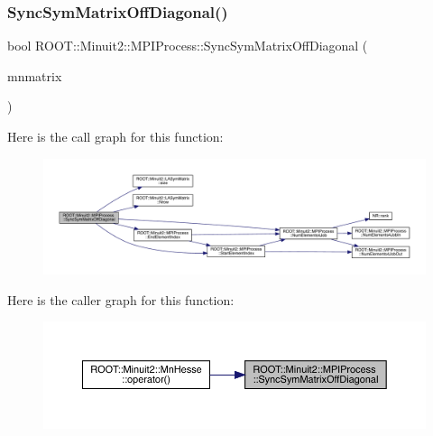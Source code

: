 \mbox{\label{classROOT_1_1Minuit2_1_1MPIProcess_ac00f83396ec6b7985dad640981a07657}} 
\subsubsection{\texorpdfstring{SyncSymMatrixOffDiagonal()}{SyncSymMatrixOffDiagonal()}\hspace{0.1cm}{\footnotesize\ttfamily [1/2]}}
{\footnotesize\ttfamily bool R\+O\+O\+T\+::\+Minuit2\+::\+M\+P\+I\+Process\+::\+Sync\+Sym\+Matrix\+Off\+Diagonal (\begin{DoxyParamCaption}\item[{\mbox{\hyperlink{namespaceROOT_1_1Minuit2_a9e74ad97f5537a2e80e52b04d98ecc6e}{R\+O\+O\+T\+::\+Minuit2\+::\+Mn\+Algebraic\+Sym\+Matrix}} \&}]{mnmatrix }\end{DoxyParamCaption})}

Here is the call graph for this function\+:\nopagebreak
\begin{figure}[H]
\begin{center}
\leavevmode
\includegraphics[width=350pt]{dc/d43/classROOT_1_1Minuit2_1_1MPIProcess_ac00f83396ec6b7985dad640981a07657_cgraph}
\end{center}
\end{figure}
Here is the caller graph for this function\+:\nopagebreak
\begin{figure}[H]
\begin{center}
\leavevmode
\includegraphics[width=350pt]{dc/d43/classROOT_1_1Minuit2_1_1MPIProcess_ac00f83396ec6b7985dad640981a07657_icgraph}
\end{center}
\end{figure}
\mbox{\label{classROOT_1_1Minuit2_1_1MPIProcess_ac00f83396ec6b7985dad640981a07657}} 
